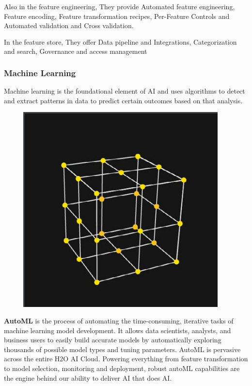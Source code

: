 \documentclass[12pt,a4paper]{report}
\begin{document}
Also in the feature engineering, They provide Automated feature engineering, Feature encoding, Feature transformation recipes, Per-Feature Controls and Automated validation and Cross validation.

In the feature store, They offer Data pipeline and Integrations, Categorization and search, Governance and access management

\subsubsection{Machine Learning}

Machine learning is the foundational element of \ac{AI} and uses algorithms to detect and extract patterns in data to predict certain outcomes based on that analysis.

\begin{figure}
\includegraphics[width=1\linewidth]{ml.png} 
\end{figure}

\textbf{\ac{AutoML}} is the process of automating the time-consuming, iterative tasks of machine learning model development. It allows data scientists, analysts, and business users to easily build accurate models by automatically exploring thousands of possible model types and tuning parameters. AutoML is pervasive across the entire H2O AI
Cloud. Powering everything from feature transformation to model selection, monitoring
and deployment, robust autoML capabilities are the engine behind our ability to deliver
AI that does AI.
\end{document}
